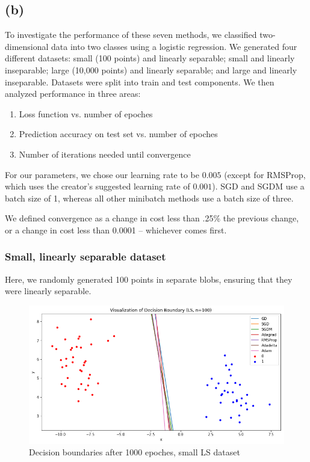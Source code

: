 \documentclass[twoside,11pt]{homework}
\begin{document}
\subsection*{(b)}
To investigate the performance of these seven methods, we classified two-dimensional data into two classes using a logistic regression. We generated four different datasets: small (100 points) and linearly separable; small and linearly inseparable; large (10,000 points) and linearly separable; and large and linearly inseparable. Datasets were split into train and test components. We then analyzed performance in three areas:

\begin{enumerate}
	\item Loss function vs. number of epoches
	\item Prediction accuracy on test set vs. number of epoches
	\item Number of iterations needed until convergence
\end{enumerate}

For our parameters, we chose our learning rate to be $0.005$ (except for RMSProp, which uses the creator's suggested learning rate of $0.001$). SGD and SGDM use a batch size of 1, whereas all other minibatch methods use a batch size of three.

We defined convergence as a change in cost less than .25\% the previous change, or a change in cost less than 0.0001 -- whichever comes first.

\subsubsection*{Small, linearly separable dataset}
Here, we randomly generated 100 points in separate blobs, ensuring that they were linearly separable.
\begin{figure}[H]
		\centering
		\includegraphics[scale=.5]{q5/sep_100/lines.png}
		\caption{Decision boundaries after 1000 epoches, small LS dataset}
	\end{figure}
\end{document}
